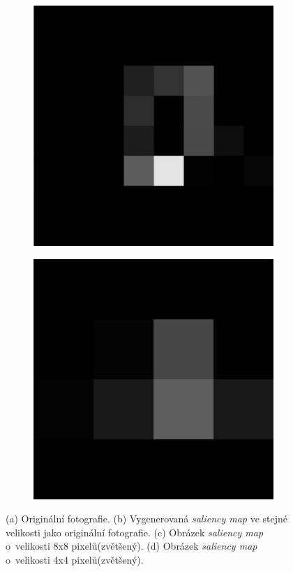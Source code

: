 \begin{figure}[H]
    \begin{subfigure}{0.49\textwidth}
      \centering
      \includegraphics[scale=1.0]{obrazky/SM8x8.jpg}
      \caption{}
    \end{subfigure}
    \begin{subfigure}{0.49\textwidth}
      \centering
      \includegraphics[scale=1.0]{obrazky/SM4x4.jpg}
      \caption{}
    \end{subfigure}
    
\caption{(a) Originální fotografie. (b) Vygenerovaná \emph{saliency map} ve stejné velikosti jako originální fotografie. (c) Obrázek \emph{saliency map} o~velikosti 8x8 pixelů(zvětšený). (d) Obrázek \emph{saliency map} o~velikosti 4x4 pixelů(zvětšený).}
\label{obr:spatialpyramid}
\end{figure}

